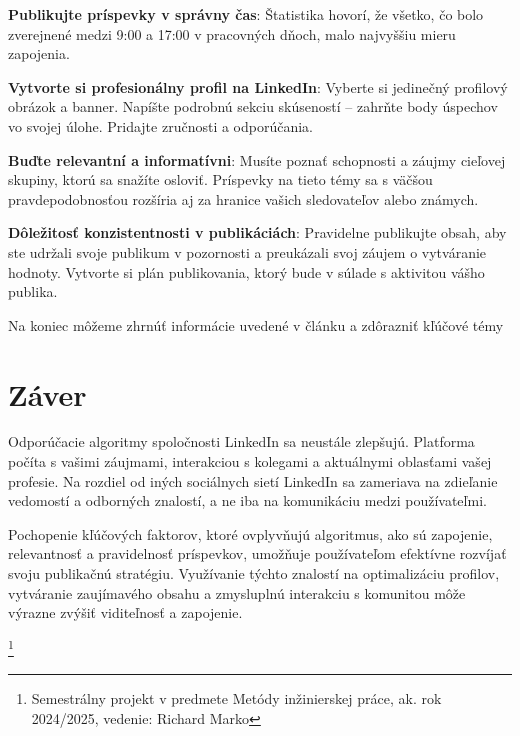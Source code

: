 \documentclass[slovak,a4paper]{coursepaper}
\begin{document}
\textbf{Publikujte príspevky v správny čas}:
Štatistika hovorí, že všetko, čo bolo zverejnené medzi 9:00 a 17:00 v pracovných dňoch, malo najvyššiu mieru zapojenia.~\cite{9}

\textbf{Vytvorte si profesionálny profil na LinkedIn}: Vyberte si jedinečný profilový obrázok a banner. Napíšte podrobnú sekciu skúseností – zahrňte body úspechov vo svojej úlohe.
Pridajte zručnosti a odporúčania.

\textbf{Buďte relevantní a informatívni}: Musíte poznať schopnosti a záujmy cieľovej skupiny, ktorú sa snažíte osloviť. Príspevky na tieto témy sa s väčšou pravdepodobnosťou rozšíria aj za hranice vašich sledovateľov alebo známych.

\textbf{Dôležitosť konzistentnosti v publikáciách}: Pravidelne publikujte obsah, aby ste udržali svoje publikum v pozornosti a preukázali svoj záujem o vytváranie hodnoty. Vytvorte si plán publikovania, ktorý bude v súlade s aktivitou vášho publika.\cite{10}

Na koniec môžeme zhrnúť informácie uvedené v článku a zdôrazniť kľúčové témy

\section{Záver} \label{zaver}
Odporúčacie algoritmy spoločnosti LinkedIn sa neustále zlepšujú. Platforma počíta s vašimi záujmami, interakciou s kolegami a aktuálnymi oblasťami vašej profesie. Na rozdiel od iných sociálnych sietí LinkedIn sa zameriava na zdieľanie vedomostí a odborných znalostí, a ne iba na komunikáciu medzi používateľmi.

Pochopenie kľúčových faktorov, ktoré ovplyvňujú algoritmus, ako sú zapojenie, relevantnosť a pravidelnosť príspevkov, umožňuje používateľom efektívne rozvíjať svoju publikačnú stratégiu. Využívanie týchto znalostí na optimalizáciu profilov, vytváranie zaujímavého obsahu a zmysluplnú interakciu s komunitou môže výrazne zvýšiť viditeľnosť a zapojenie.

\thanks{Semestrálny projekt v predmete Metódy inžinierskej práce, ak. rok 2024/2025, vedenie: Richard Marko}



\end{document}
